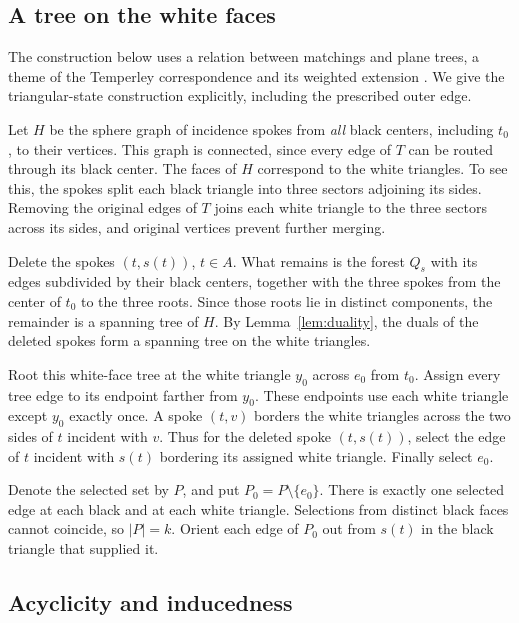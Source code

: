 \documentclass[11pt]{article}
\theoremstyle{remark}
\newcommand{\abs}[1]{\left|#1\right|}
\numberwithin{equation}{section}
\begin{document}
\subsection{A tree on the white faces}

The construction below uses a relation between matchings and plane
trees, a theme of the Temperley correspondence and its weighted
extension \cite[Theorem~1]{KPW2000}. We give the triangular-state
construction explicitly, including the prescribed outer edge.

Let \(H\) be the sphere graph of incidence spokes from
\emph{all} black centers, including \(t_0\), to their
vertices. This graph is connected, since every edge
of \(T\) can be routed through its black center.
The faces of \(H\) correspond to the white triangles.
To see this, the spokes split each black triangle
into three sectors adjoining its sides. Removing
the original edges of \(T\) joins each white triangle
to the three sectors across its sides, and original
vertices prevent further merging.

Delete the spokes \((t,s(t))\), \(t\in A\).
What remains is the forest \(Q_s\) with its edges
subdivided by their black centers, together with
the three spokes from the center of \(t_0\) to the
three roots. Since those roots lie in distinct
components, the remainder is a spanning tree of \(H\).
By Lemma~\ref{lem:duality}, the duals of the deleted
spokes form a spanning tree on the white triangles.

Root this white-face tree at the white triangle \(y_0\)
across \(e_0\) from \(t_0\). Assign every tree edge to
its endpoint farther from \(y_0\). These endpoints
use each white triangle except \(y_0\) exactly once.
A spoke \((t,v)\) borders the white triangles across
the two sides of \(t\) incident with \(v\).
Thus for the deleted spoke \((t,s(t))\), select the
edge of \(t\) incident with \(s(t)\) bordering its
assigned white triangle. Finally select \(e_0\).

Denote the selected set by \(P\), and put
\(P_0=P\setminus\{e_0\}\).
There is exactly one selected edge at each black
and at each white triangle. Selections from distinct
black faces cannot coincide, so \(\abs P=k\).
Orient each edge of \(P_0\) out from \(s(t)\) in the
black triangle that supplied it.

\subsection{Acyclicity and inducedness}
\end{document}
